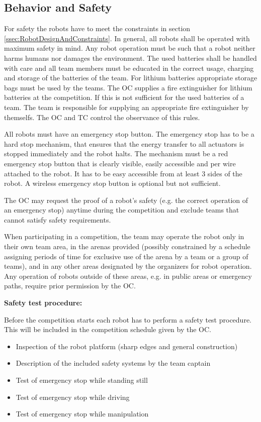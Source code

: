 \subsection{Behavior and Safety} \label{ssec:RobotBehaviorAndSafety}
For safety the robots have to meet the constraints in section \ref{ssec:RobotDesignAndConstraints}. In general, all robots shall be operated with maximum safety in mind. Any robot operation must be such that a robot neither harms humans nor damages the environment. 
The used batteries shall be handled with care and all team members must be educated in the correct usage, charging and storage of the batteries of the team. For lithium batteries appropriate storage bags must be used by the teams. The OC supplies a fire extinguisher for lithium batteries at the competition. If this is not sufficient for the used batteries of a team. The team is responsible for supplying an appropriate fire extinguisher by themselfs. The OC and TC control the observance of this rules.

All robots must have an emergency stop button. The emergency stop has to be a hard stop mechanism, that ensures that the energy transfer to all actuators is stopped immediately and the robot halts. The mechanism must be a red emergency stop button that is clearly visible, easily accessible and per wire attached to the robot. It has to be easy accessible from at least 3 sides of the robot. A wireless emergency stop button is optional but not sufficient.

The OC may request the proof of a robot's safety (e.g. the correct operation of an emergency stop) anytime during the competition and exclude teams that cannot satisfy safety requirements.

When participating in a competition, the team may operate the robot only in their own team area, in the arenas provided (possibly constrained by a schedule assigning periods of time for exclusive use of the arena by a team or a group of teams), and in any other areas designated by the organizers for robot operation. Any operation of robots outside of these areas, e.g. in public areas or emergency paths, require prior permission by the OC.

\textbf{Safety test procedure:}

Before the competition starts each robot has to perform a safety test procedure. This will be included in the competition schedule given by the OC.
\begin{itemize}
	\item Inspection of the robot platform (sharp edges and general construction)
	\item Description of the included safety systems by the team captain 
	\item Test of emergency stop while standing still
	\item Test of emergency stop while driving 
	\item Test of emergency stop while manipulation
\end{itemize}

